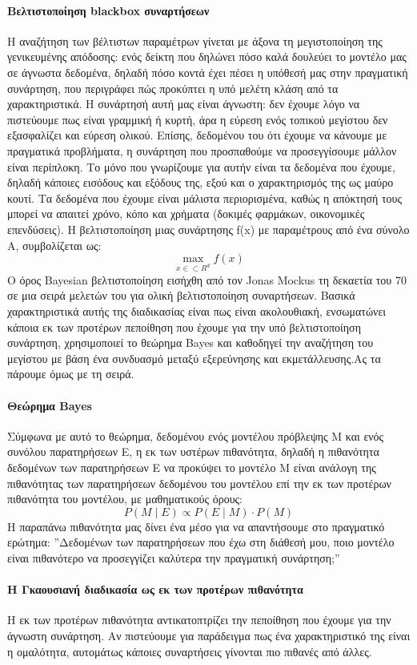 \documentclass{article}
\begin{document}
\paragraph{Βελτιστοποίηση blackbox συναρτήσεων} Η αναζήτηση των βέλτιστων παραμέτρων γίνεται με άξονα τη μεγιστοποίηση της γενικευμένης απόδοσης: ενός δείκτη που δηλώνει πόσο καλά δουλεύει το μοντέλο μας σε άγνωστα δεδομένα, δηλαδή πόσο κοντά έχει πέσει η υπόθεσή μας στην πραγματική συνάρτηση, που περιγράφει πώς προκύπτει η υπό μελέτη κλάση από τα χαρακτηριστικά. Η συνάρτησή αυτή μας είναι άγνωστη: δεν έχουμε λόγο να πιστεύουμε πως είναι γραμμική ή κυρτή, άρα η εύρεση ενός τοπικού μεγίστου δεν εξασφαλίζει και εύρεση ολικού. Επίσης, δεδομένου του ότι έχουμε να κάνουμε με πραγματικά προβλήματα, η συνάρτηση που προσπαθούμε να προσεγγίσουμε μάλλον είναι περίπλοκη. Το μόνο που γνωρίζουμε για αυτήν είναι τα δεδομένα που έχουμε, δηλαδή κάποιες εισόδους και εξόδους της, εξού και ο χαρακτηρισμός της ως μαύρο κουτί. Τα δεδομένα που έχουμε είναι μάλιστα περιορισμένα, καθώς η απόκτησή τους μπορεί να απαιτεί χρόνο, κόπο και χρήματα (δοκιμές φαρμάκων, οικονομικές επενδύσεις). Η βελτιστοποίηση μιας συνάρτησης f(x) με παραμέτρους από ένα σύνολο A, συμβολίζεται ως:
$$\max_{x \in \subset R^d } f(x)$$
Ο όρος Bayesian βελτιστοποίηση εισήχθη από τον Jonas Mockus τη δεκαετία του 70 σε μια σειρά μελετών του για ολική βελτιστοποίηση συναρτήσεων. Βασικά χαρακτηριστικά αυτής της διαδικασίας είναι πως είναι ακολουθιακή, ενσωματώνει κάποια εκ των προτέρων πεποίθηση που έχουμε για την υπό βελτιστοποίηση συνάρτηση, χρησιμοποιεί το θεώρημα Bayes και καθοδηγεί την αναζήτηση του μεγίστου με βάση ένα συνδυασμό μεταξύ εξερεύνησης και εκμετάλλευσης.Ας τα πάρουμε όμως με τη σειρά.
\paragraph{Θεώρημα Bayes} Σύμφωνα με αυτό το θεώρημα, δεδομένου ενός μοντέλου πρόβλεψης M και ενός συνόλου παρατηρήσεων Ε, η εκ των υστέρων πιθανότητα, δηλαδή η πιθανότητα δεδομένων των παρατηρήσεων Ε να προκύψει το μοντέλο M είναι ανάλογη της πιθανότητας των παρατηρήσεων δεδομένου του μοντέλου επί την εκ των προτέρων πιθανότητα του μοντέλου, με μαθηματικούς όρους:
$$P(M \mid E) \propto P(E \mid M) \cdot P(M) $$
Η παραπάνω πιθανότητα μας δίνει ένα μέσο για να απαντήσουμε στο πραγματικό ερώτημα: ”Δεδομένων των παρατηρήσεων που έχω στη διάθεσή μου, ποιο μοντέλο είναι πιθανότερο να προσεγγίζει καλύτερα την πραγματική συνάρτηση;”
\paragraph{Η Γκαουσιανή διαδικασία ως εκ των προτέρων πιθανότητα} Η εκ των προτέρων πιθανότητα αντικατοπτρίζει την πεποίθηση που έχουμε για την άγνωστη συνάρτηση. Αν πιστεύουμε για παράδειγμα πως ένα χαρακτηριστικό της είναι η ομαλότητα, αυτομάτως κάποιες συναρτήσεις γίνονται πιο πιθανές από άλλες.
\end{document}
